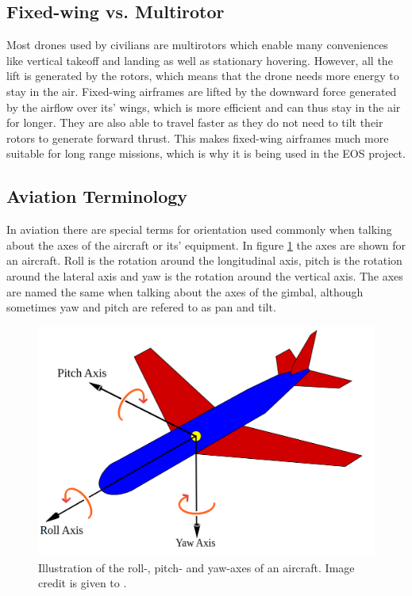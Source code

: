 \documentclass[nofilelist]{cslthse-msc}
\begin{document}
\subsection{Fixed-wing vs. Multirotor}
Most drones used by civilians are multirotors which enable many conveniences like vertical takeoff and landing as well as stationary hovering. However, all the lift is generated by the rotors, which means that the drone needs more energy to stay in the air. Fixed-wing airframes are lifted by the downward force generated by the airflow over its' wings, which is more efficient and can thus stay in the air for longer. They are also able to travel faster as they do not need to tilt their rotors to generate forward thrust. This makes fixed-wing airframes much more suitable for long range missions, which is why it is being used in the EOS project.

\subsection{Aviation Terminology}
In aviation there are special terms for orientation used commonly when talking about the axes of the aircraft or its' equipment. In figure \ref{fig:aircraft-axes} the axes are shown for an aircraft. Roll is the rotation around the longitudinal axis, pitch is the rotation around the lateral axis and yaw is the rotation around the vertical axis. The axes are named the same when talking about the axes of the gimbal, although sometimes yaw and pitch are refered to as pan and tilt.

\begin{figure}[!hbt]
   \centering
   \includegraphics[scale=0.25]{images/pitch-yaw-roll.png} 
   \caption{Illustration of the roll-, pitch- and yaw-axes of an aircraft. Image credit is given to \cite{aircraft-axes-pic}.}
   \label{fig:aircraft-axes}
\end{figure}
\end{document}
